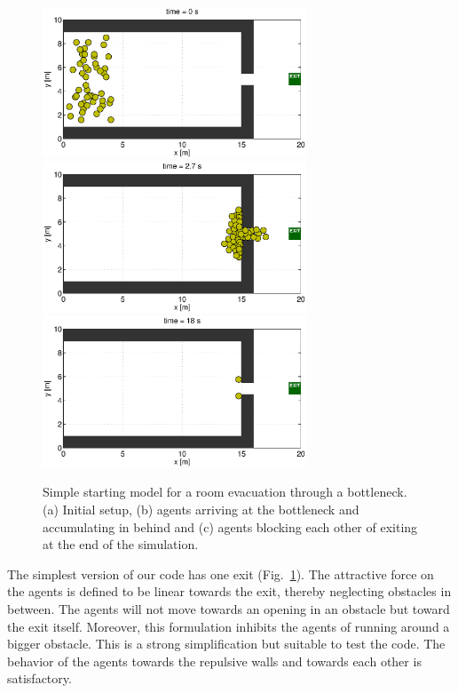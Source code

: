 \documentclass[11pt]{article}
\begin{document}
\begin{figure}
	\begin{center}
	\includegraphics[width=0.7\textwidth]
	{figures/Model1_direct_1_000000.eps}
	\qquad
	\includegraphics[width=0.7\textwidth]
	{figures/Model1_direct_1_000270.eps}
	\qquad
	\includegraphics[width=0.7\textwidth]
	{figures/Model1_direct_1_001800.eps}
	\caption{Simple starting model for a room evacuation through a bottleneck. (a) Initial setup, (b) agents arriving at the bottleneck and accumulating in behind and (c) agents blocking each other of exiting at the end of the simulation.}
	\label{fig:simple1}
	\end{center}
\end{figure}

The simplest version of our code has one exit (Fig.~\ref{fig:simple1}). The attractive force on the agents is defined to be linear towards the exit, thereby neglecting obstacles in between. The agents will not move towards an opening in an obstacle but toward the exit itself. Moreover, this formulation inhibits the agents of running around a bigger obstacle. This is a strong simplification but suitable to test the code. The behavior of the agents towards the repulsive walls and towards each other is satisfactory.
\end{document}
